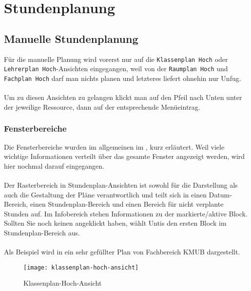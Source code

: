 
\chapter{Stundenplanung}
\label{chap:schedules}

\section{Manuelle Stundenplanung}

Für die manuelle Planung wird vorerst nur auf die \texttt{Klassenplan Hoch} oder \texttt{Lehrerplan Hoch}-Ansichten eingegangen, weil von der \texttt{Raumplan Hoch} und \texttt{Fachplan Hoch} darf man nichts planen und letzteres liefert ohnehin nur Unfug.\\
\\
Um zu diesen Ansichten zu gelangen klickt man auf den Pfeil nach Unten unter der jeweilige Ressource, dann auf der entsprechende Menüeintrag.

\subsection{Fensterbereiche}
\label{sec:stundenplan-fensterbereiche}

Die Fensterbereiche wurden im allgemeinen im , kurz erläutert. Weil viele wichtige Informationen verteilt über das gesamte Fenster angezeigt werden, wird hier nochmal darauf eingegangen.\\
\\
Der Rasterbereich in Stundenplan-Ansichten ist sowohl für die Darstellung als auch die Gestaltung der Pläne verantwortlich und teilt sich in einen Datum-Bereich, einen Stundenplan-Bereich und einen Bereich für nicht verplante Stunden auf. Im Infobereich stehen Informationen zu der markierte/aktive Block. Sollten Sie noch keinen angeklickt haben, wählt Untis den ersten Block im Stundenplan-Bereich aus.\\
\\
Als Beispiel wird in  ein sehr gefüllter Plan von Fachbereich KMUB dargestellt.

\newpage

\begin{figure}[h]
	\centering
	\texttt{[image: klassenplan-hoch-ansicht]}
	\vspace{-5pt}
	\caption{Klassenplan-Hoch-Ansicht}
	\label{fig:klassenplan-hoch-ansicht}
\end{figure}

